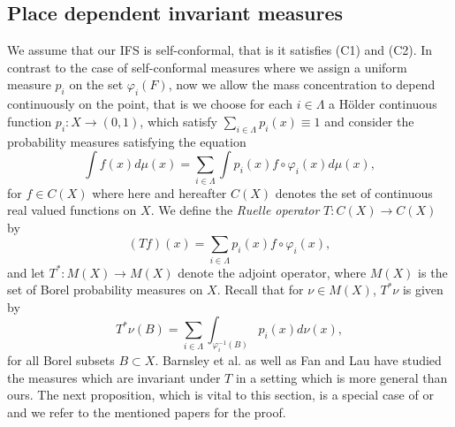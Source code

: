 \documentclass{PRM}
\theoremstyle{plain}
\theoremstyle{definition}
\theoremstyle{remark}
\begin{document}
\subsection{Place dependent invariant measures}
We assume that our IFS is self-conformal, that is it satisfies (C1) and (C2). In contrast to the case of self-conformal measures where we assign a uniform measure $p_i$ on the set $\varphi_i(F)$, now we allow the mass concentration to depend continuously on the point, that is we choose for each $i\in\Lambda$ a Hölder continuous function $p_i\colon X\to (0,1)$, which satisfy $\sum_{i\in\Lambda}p_i(x)\equiv 1$ and consider the probability  measures satisfying the equation
\begin{equation}\label{eq:pdssm}
    \int f(x)d\mu(x)=\sum_{i\in\Lambda}\int p_i(x)f\circ \varphi_i(x)d\mu(x),
\end{equation}
for $f\in C(X)$ where here and hereafter $C(X)$ denotes the set of continuous real valued functions on $X$. We define the \emph{Ruelle operator} $T\colon C(X)\to C(X)$ by
\begin{equation}\label{eq:ruelle}
    (Tf)(x)=\sum_{i\in\Lambda}p_i(x)f\circ \varphi_i(x),
\end{equation}
and let $T^*\colon M(X)\to M(X)$ denote the adjoint operator, where $M(X)$ is the set of Borel probability measures on $X$. Recall that for $\nu\in M(X)$, $T^*\nu$ is given by
\begin{equation*}
    T^*\nu(B)=\sum_{i\in\Lambda}\int_{\varphi_i^{-1}(B)}p_i(x)d\nu(x),
\end{equation*}
for all Borel subsets $B\subset X$. Barnsley et al. \cite{Barn} as well as Fan and Lau \cite{Fan} have studied the measures which are invariant under $T$ in a setting which is more general than ours. The next proposition, which is vital to this section, is a special case of \cite[Theorem 1.1]{Fan} or \cite[Theorem 2.1]{Barn} and we refer to the mentioned papers for the proof.
\end{document}
